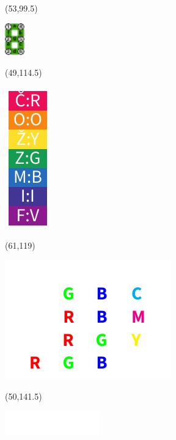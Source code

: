 \documentclass{extarticle}
\begin{document}
\begin{textblock}{0}(53,99.5)
\vfill
{\centerline{\includegraphics[height=14mm]{tools/images/segment-numbering.pdf}}} 
\vfill
\end{textblock}

\begin{textblock}{7.6}(49,114.5)
\vfill
{\centerline{\includegraphics[scale=0.7]{tools/rainbow-v3.pdf}}} 
\vfill
\end{textblock}

\begin{textblock}{27.2}(61,119)
\vfill
{\centerline{\includegraphics[scale=0.7]{tools/mixing-rgb.pdf}}} 
\vfill
\end{textblock}

\begin{textblock}{38}(50,141.5)
\vfill
{\centerline{\includegraphics[width=41mm]{tools/nato.pdf}}} 
\vfill
\end{textblock}
\end{document}
